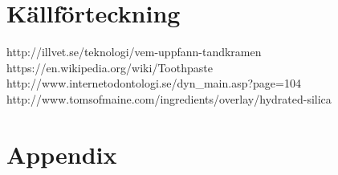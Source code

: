 \documentclass[12pt]{article}
\begin{document}
	\newpage
	\section{Källförteckning}
	http://illvet.se/teknologi/vem-uppfann-tandkramen\\
	https://en.wikipedia.org/wiki/Toothpaste\\
	http://www.internetodontologi.se/dyn\_main.asp?page=104\\
	http://www.tomsofmaine.com/ingredients/overlay/hydrated-silica\\
	\newpage
	\section{Appendix}
\end{document}
